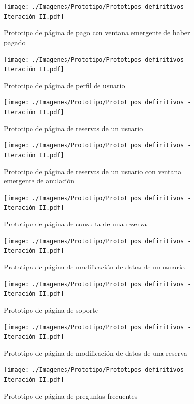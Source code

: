 \begin{figure}[H]
    \centering
    \texttt{[image: ./Imagenes/Prototipo/Prototipos definitivos - Iteración II.pdf]}
    \caption{Prototipo de página de pago con ventana emergente de haber pagado}
    \label{fig:prot2_pago_popup}
\end{figure}

\begin{figure}[H]
    \centering
    \texttt{[image: ./Imagenes/Prototipo/Prototipos definitivos - Iteración II.pdf]}
    \caption{Prototipo de página de perfil de usuario}
    \label{fig:prot2_perfil}
\end{figure}

\begin{figure}[H]
    \centering
    \texttt{[image: ./Imagenes/Prototipo/Prototipos definitivos - Iteración II.pdf]}
    \caption{Prototipo de página de reservas de un usuario}
    \label{fig:prot2_reservas_usuario}
\end{figure}

\begin{figure}[H]
    \centering
    \texttt{[image: ./Imagenes/Prototipo/Prototipos definitivos - Iteración II.pdf]}
    \caption{Prototipo de página de reservas de un usuario con ventana emergente de anulación}
    \label{fig:prot2_reservas_usuario_popup}
\end{figure}

\begin{figure}[H]
    \centering
    \texttt{[image: ./Imagenes/Prototipo/Prototipos definitivos - Iteración II.pdf]}
    \caption{Prototipo de página de consulta de una reserva}
    \label{fig:prot2_reservas_mod}
\end{figure}

\begin{figure}[H]
    \centering
    \texttt{[image: ./Imagenes/Prototipo/Prototipos definitivos - Iteración II.pdf]}
    \caption{Prototipo de página de modificación de datos de un usuario}
    \label{fig:prot2_usuario_mod}
\end{figure}

\begin{figure}[H]
    \centering
    \texttt{[image: ./Imagenes/Prototipo/Prototipos definitivos - Iteración II.pdf]}
    \caption{Prototipo de página de soporte}
    \label{fig:prot2_soporte}
\end{figure}

\begin{figure}[H]
    \centering
    \texttt{[image: ./Imagenes/Prototipo/Prototipos definitivos - Iteración II.pdf]}
    \caption{Prototipo de página de modificación de datos de una reserva}
    \label{fig:prot2_reserva_mod}
\end{figure}

\begin{figure}[H]
    \centering
    \texttt{[image: ./Imagenes/Prototipo/Prototipos definitivos - Iteración II.pdf]}
    \caption{Prototipo de página de preguntas frecuentes}
    \label{fig:prot2_faq}
\end{figure}
